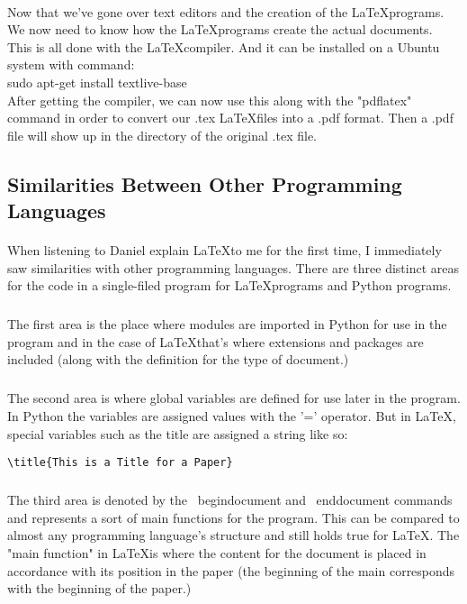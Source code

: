 \documentclass[letterpaper,12pt]{article}
\begin{document}
\paragraph{}
Now that we've gone over text editors and the creation of the \LaTeX programs. We now need to know how the \LaTeX programs
create the actual documents. This is all done with the \LaTeX compiler. And it can be installed on a Ubuntu system with command:\\
sudo apt-get install textlive-base\\
After getting the compiler, we can now use this along with the "pdflatex" command in order to convert our .tex \LaTeX files into
a .pdf format. Then a .pdf file will show up in the directory of the original .tex file. 

\subsection{Similarities Between Other Programming Languages}

\paragraph{}
When listening to Daniel explain \LaTeX to me for the first time, I immediately saw similarities with other programming languages.
There are three distinct areas for the code in a single-filed program for \LaTeX programs and Python programs. 

\subparagraph{}
The first area is the place where modules are imported in Python for use in the program and in the case of \LaTeX that's 
where extensions and packages are included (along with the definition for the type of document.)

\subparagraph{}
The second area is where global variables are defined for use later in the program. In Python the variables are assigned values
with the '=' operator. But in \LaTeX, special variables such as the title are assigned a string like so:
\begin{verbatim}\title{This is a Title for a Paper}\end{verbatim}

\subparagraph{}
The third area is denoted by the \ begin{document} and \ end{document} commands and represents a sort of main functions for the 
program. This can be compared to almost any programming language's structure and still holds true for \LaTeX. The "main function" in
\LaTeX is where the content for the document is placed in accordance with its position in the paper (the beginning of the main
corresponds with the beginning of the paper.)
\end{document}

